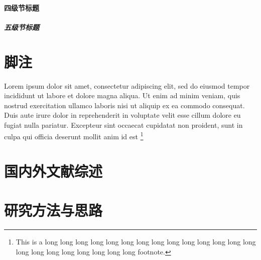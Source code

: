 \paragraph{四级节标题}

\subparagraph{五级节标题}

\section{脚注}

Lorem ipsum dolor sit amet, consectetur adipiscing elit, sed do eiusmod tempor
incididunt ut labore et dolore magna aliqua. Ut enim ad minim veniam, quis
nostrud exercitation ullamco laboris nisi ut aliquip ex ea commodo consequat.
Duis aute irure dolor in reprehenderit in voluptate velit esse cillum dolore eu
fugiat nulla pariatur. Excepteur sint occaecat cupidatat non proident, sunt in
culpa qui officia deserunt mollit anim id est 
\footnote{This is a long long long long long long long long long long long long
long long long long long long long long long long footnote.}

\section{国内外文献综述}


\section{研究方法与思路}
